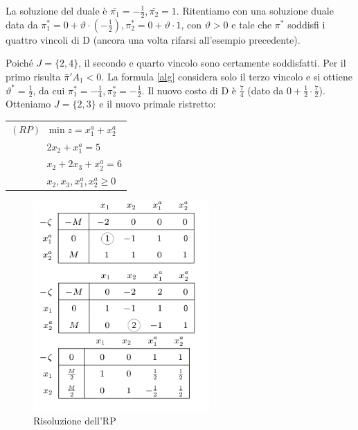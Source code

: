 \documentclass[11pt]{book}
\begin{document}
La soluzione del duale \`e $\bar{\pi_1} = -\frac{1}{2}, \bar{\pi_2} =
1$. Ritentiamo con una soluzione duale data da $\pi_1^* = 0 +
\vartheta\cdot (-\frac{1}{2}), \pi_2^* = 0 + \vartheta\cdot 1$, con
$\vartheta > 0$ e tale che $\pi^*$ soddisfi i quattro vincoli di D
(ancora una volta rifarsi all'esempio precedente).

Poich\'e $J = \{ 2, 4\}$, il secondo e quarto vincolo sono certamente
soddisfatti. Per il primo risulta $\bar{\pi}'A_1<0$. La formula
\ref{alg} considera solo il terzo vincolo e si ottiene $\vartheta^* =
\frac{1}{2}$, da cui $\pi_1^*= - \frac{1}{4}, \pi_2^* =
-\frac{1}{2}$. Il nuovo costo di D \`e $\frac{7}{4}$ (dato da $0 +
\frac{1}{2} \cdot \frac{7}{2}$). Otteniamo $J = \{ 2,3\}$ e il nuovo
primale ristretto:

\vspace{11pt}
\begin{center}
\begin{tabular}{l}
$(RP)\phantom{a}\min z = x_1^a + x_2^a$\\
$\phantom{RPamin}2x_2 + x_1^a = 5$\\
$\phantom{RPamin}x_2 + 2x_3 + x_2^a = 6$\\
$\phantom{RPamin}x_2, x_3, x_1^a, x_2^a \geq 0$\\
\end{tabular}
\end{center}
\vspace{11pt}

\begin{figure}[h!]
  \centering
  \includegraphics[width=0.6\textwidth]{images/cap5tab87.png}
  \caption{Risoluzione dell'RP}
  \label{cap5tab87}
\end{figure}
\end{document}
